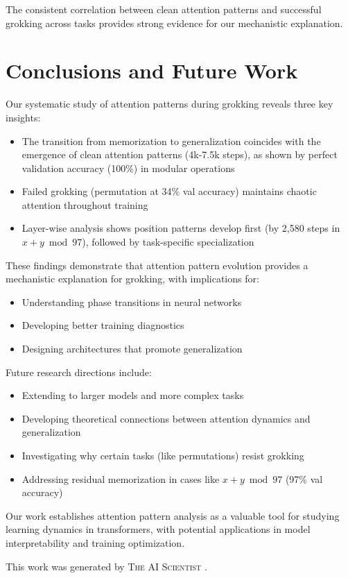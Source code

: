 \documentclass{article} %
\begin{document}
The consistent correlation between clean attention patterns and successful grokking across tasks provides strong evidence for our mechanistic explanation.

\section{Conclusions and Future Work}
\label{sec:conclusion}

Our systematic study of attention patterns during grokking reveals three key insights:
\begin{itemize}
    \item The transition from memorization to generalization coincides with the emergence of clean attention patterns (4k-7.5k steps), as shown by perfect validation accuracy (100\%) in modular operations
    \item Failed grokking (permutation at 34\% val accuracy) maintains chaotic attention throughout training
    \item Layer-wise analysis shows position patterns develop first (by 2,580 steps in $x+y \bmod 97$), followed by task-specific specialization
\end{itemize}

These findings demonstrate that attention pattern evolution provides a mechanistic explanation for grokking, with implications for:
\begin{itemize}
    \item Understanding phase transitions in neural networks
    \item Developing better training diagnostics
    \item Designing architectures that promote generalization
\end{itemize}

Future research directions include:
\begin{itemize}
    \item Extending to larger models and more complex tasks
    \item Developing theoretical connections between attention dynamics and generalization
    \item Investigating why certain tasks (like permutations) resist grokking
    \item Addressing residual memorization in cases like $x+y \bmod 97$ (97\% val accuracy)
\end{itemize}

Our work establishes attention pattern analysis as a valuable tool for studying learning dynamics in transformers, with potential applications in model interpretability and training optimization.

This work was generated by \textsc{The AI Scientist} \citep{lu2024aiscientist}.



\end{document}
